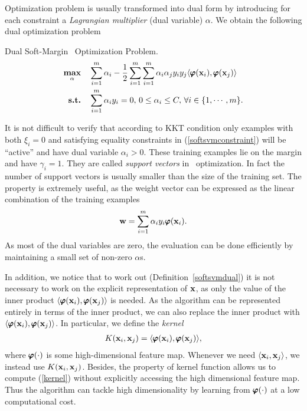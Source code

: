 {%
Optimization problem is usually transformed into dual form by introducing for each constraint a \textit{Lagrangian multiplier} (dual variable) $\alpha$.
We obtain the following dual optimization problem
\begin{definition}{Dual Soft-Margin \svm\ Optimization Problem.}\label{softsvmdual}
	\begin{align*}
		\underset{\mathbf {\alpha}}{\textbf{max}} & \quad\sum_{i=1}^{m}\alpha_i -\frac{1}{2}\sum_{i=1}^{m}\sum_{i=1}^{m}\alpha_i\alpha_jy_iy_j\langle \pmb \varphi(\mathbf {x}_i), \pmb \varphi(\mathbf {x}_j) \rangle\\
		\textbf{s.t.} & \quad \sum_{i=1}^{m}\alpha_iy_i=0, \, 0\le\alpha_i\le C, \, \forall i\in\{1,\cdots,m\}.
	\end{align*}
\end{definition}
It is not difficult to verify that according to KKT condition only examples with both $\xi_i=0$ and satisfying equality constraints in (\ref{softsvmconstraint}) will be ``active'' and have dual variable $\alpha_i>0$.
These training examples lie on the margin and have $\gamma_i=1$.
They are called \textit{support vectors} in \svm\ optimization.
In fact the number of support vectors is usually smaller than the size of the training set.
The property is extremely useful, as the weight vector can be expressed as the linear combination of the training examples
\begin{align*}
	\mathbf {w} = \sum_{i=1}^{m}\alpha_iy_i\pmb \varphi(\mathbf {x}_i).
\end{align*}
As most of the dual variables are zero, the evaluation can be done efficiently by maintaining a small set of non-zero $\alpha$s.

In addition, we notice that to work out (Definition~\ref{softsvmdual}) it is not necessary to work on the explicit representation of $\mathbf {x}$, as only the value of the inner product $\langle \pmb \varphi(\mathbf {x}_i), \pmb \varphi(\mathbf {x}_j) \rangle$ is needed.
As the algorithm can be represented entirely in terms of the inner product, we can also replace the inner product with $\langle \pmb \varphi(\mathbf {x}_i), \pmb \varphi(\mathbf {x}_j) \rangle$.
In particular, we define the \textit{kernel}
\begin{align}
	K(\mathbf {x}_i,\mathbf {x}_j) = \langle \pmb \varphi(\mathbf {x}_i), \pmb \varphi(\mathbf {x}_j) \rangle, \label{kernel}
\end{align}
where $\pmb \varphi(\cdot)$ is some high-dimensional feature map.
Whenever we need $\langle \mathbf {x}_i, \mathbf {x}_j \rangle$, we instead use $K(\mathbf {x}_i,\mathbf {x}_j)$.
Besides, the property of kernel function \citep{Scholkopf02learning} allows us to compute (\ref{kernel}) without explicitly accessing the high dimensional feature map.
Thus the algorithm can tackle high dimensionality by learning from $\pmb \varphi(\cdot)$ at a low computational cost.

}
